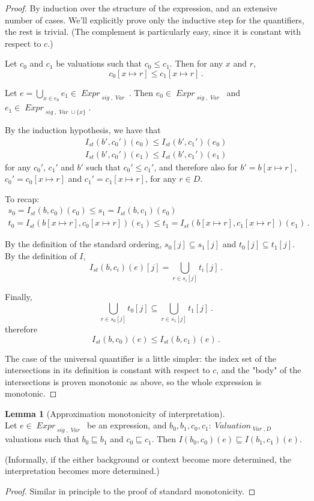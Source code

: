 \documentclass[oneside,12pt]{book}
\theoremstyle{definition}
\newtheorem{lemma}[theorem]{Lemma}
\theoremstyle{remark}
\newcommand\var[1]{\mathop{\mathit{#1}}\nolimits}
\newcommand{\approximates}{\sqsubseteq}
\newcommand{\sig}{\var{sig}}
\newcommand{\st}{\var{st}}
\newcommand{\Var}{\var{Var}}
\newcommand{\Valuation}{\var{Valuation}}
\newcommand{\Expr}{\var{Expr}}
\begin{document}
\begin{proof}
  By induction over the structure of the expression, and an extensive number
  of cases. We'll explicitly prove only the inductive step for the quantifiers,
  the rest is trivial. (The complement is particularly easy,
  since it is constant with respect to $c$.)
  
  Let $c_0$ and $c_1$ be valuations such that $c_0 \leq c_1$. Then for any
  $x$ and $r$, \[c_0[x {\mapsto} r] \leq c_1[x {\mapsto} r]\,.\]
  
  Let $e = \displaystyle\bigcup_{x \in e_0}e_1 \in \Expr_{\sig,\Var}$.
  Then $e_0 \in \Expr_{\sig,\Var}$ and $e_1 \in \Expr_{\sig,\Var\cup\{x\}}$.
  
  By the induction hypothesis, we have that
  \begin{align*}
    I_{\st}(b', c_0')(e_0) \leq I_{\st}(b', c_1')(e_0) \\
    I_{\st}(b', c_0')(e_1) \leq I_{\st}(b', c_1')(e_1)
  \end{align*}
  for any $c_0'$, $c_1'$ and $b'$ such that $c_0' \leq c_1'$, and therefore also
  for $b' = b[x {\mapsto} r]$, $c_0' = c_0[x {\mapsto} r]$
  and $c_1' = c_1[x {\mapsto} r]$, for any $r \in D$.
  
  To recap:
  \begin{gather*}
    s_0 = I_{\st}(b, c_0)(e_0) \leq s_1 = I_{\st}(b, c_1)(e_0) \\
    t_0 = I_{\st}(b[x {\mapsto} r], c_0[x {\mapsto} r])(e_1)
      \leq t_1 =  I_{\st}(b[x {\mapsto} r], c_1[x {\mapsto} r])(e_1)\,.
  \end{gather*}
  
  By the definition of the standard ordering, $s_0[j] \subseteq s_1[j]$
  and $t_0[j] \subseteq t_1[j]$. By the definition of $I$,
  \[I_{\st}(b, c_i)(e)[j] = \bigcup_{r \in s_i[j]}t_i[j]\,.\]
  
  Finally, \[\bigcup_{r \in s_0[j]}t_0[j] \subseteq \bigcup_{r \in s_1[j]}t_1[j]\,.\]
  therefore \[I_{\st}(b, c_0)(e) \leq I_{\st}(b, c_1)(e)\,.\]
  
  \noindent %
  The case of the universal quantifier is a little simpler: the index set of the
  intersections in its definition is constant with respect to $c$, and the
  "body" of the intersections is proven monotonic as above, so the whole
  expression is monotonic.
\end{proof}

\begin{lemma}[Approximation monotonicity of interpretation]
\label{monoInterpKnow} \hfill \\
  Let $e \in \Expr_{\sig,\Var}$ be an expression, and 
  $b_0, b_1, c_0, c_1\colon \Valuation_{\Var,D}$ valuations such that
  $b_0 \approximates b_1$ and $c_0 \approximates c_1$.
  Then $I(b_0, c_0)(e) \approximates I(b_1, c_1)(e)$.
  
  (Informally, if the either background or context become more determined,
  the interpretation becomes more determined.)
\end{lemma}
\begin{proof}
  Similar in principle to the proof of standard monotonicity.
\end{proof}
\end{document}
